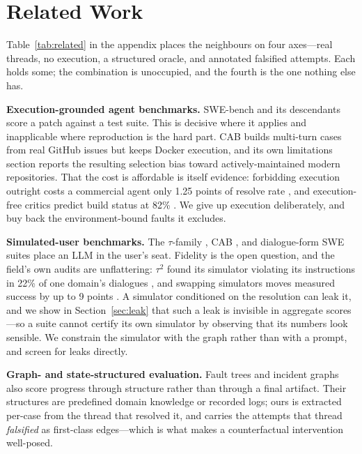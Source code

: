 \documentclass{article} %
\begin{document}
\section{Related Work}
\label{sec:related}

Table~\ref{tab:related} in the appendix places the neighbours on four
axes---real threads, no execution, a structured oracle, and annotated
falsified attempts. Each holds some; the combination is unoccupied, and
the fourth is the one nothing else has.

\textbf{Execution-grounded agent benchmarks.} SWE-bench
\citep{swebench2024} and its descendants score a patch against a test
suite. This is decisive where it applies and inapplicable where
reproduction is the hard part. CAB \citep{cab2025} builds multi-turn
cases from real GitHub issues but keeps Docker execution, and its own
limitations section reports the resulting selection bias toward
actively-maintained modern repositories. That the cost is affordable is
itself evidence: forbidding execution outright costs a commercial agent
only 1.25 points of resolve rate \citep{torun2026}, and execution-free
critics predict build status at 82\% \citep{llmcritics2025,swejudge2025}.
We give up execution deliberately, and buy back the environment-bound
faults it excludes.

\textbf{Simulated-user benchmarks.} The $\tau$-family
\citep{taubench2024,tau2bench2025}, CAB \citep{cab2025}, and
dialogue-form SWE suites \citep{dialogueswe2026,cirrusbench2026} place an
LLM in the user's seat. Fidelity is the open question, and the field's
own audits are unflattering: $\tau^2$ found its simulator violating its
instructions in 22\% of one domain's dialogues \citep{tau2bench2025}, and
swapping simulators moves measured success by up to 9 points
\citep{lostinsimulation2026}. A simulator conditioned on the resolution
can leak it, and we show in Section~\ref{sec:leak} that such a leak is
invisible in aggregate scores---so a suite cannot certify its own
simulator by observing that its numbers look sensible. We constrain the
simulator with the graph rather than with a prompt, and screen for leaks
directly.

\textbf{Graph- and state-structured evaluation.} Fault trees
\citep{jfta2026} and incident graphs \citep{excytin2026} also score
progress through structure rather than through a final artifact. Their
structures are predefined domain knowledge or recorded logs; ours is
extracted per-case from the thread that resolved it, and carries the
attempts that thread \emph{falsified} as first-class edges---which is
what makes a counterfactual intervention well-posed.
\end{document}
